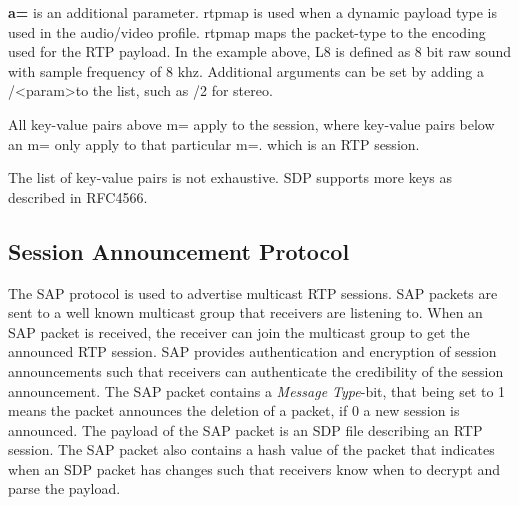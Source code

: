 \textbf{a=} is an additional parameter. rtpmap is used when a dynamic payload type is used in the audio/video profile. rtpmap maps the packet-type to the encoding used for the RTP payload. In the example above, L8 is defined as 8 bit raw sound with sample frequency of 8 khz. Additional arguments can be set by adding a /\textless param\textgreater to the list, such as /2 for stereo.

All key-value pairs above m= apply to the session, where key-value pairs below an m= only apply to that particular m=. which is an RTP session.

The list of key-value pairs is not exhaustive. SDP supports more keys as described in RFC4566.


\subsection{Session Announcement Protocol} \label{sec:design:sap}
The \ac{SAP} protocol is used to advertise multicast RTP sessions. SAP packets are sent to a well known multicast group that receivers are listening to. When an SAP packet is received, the receiver can join the multicast group to get the announced RTP session. SAP provides authentication and encryption of session announcements such that receivers can authenticate the credibility of the session announcement. The SAP packet contains a \textit{Message Type}-bit, that being set to 1 means the packet announces the deletion of a packet, if 0 a new session is announced. The payload of the SAP packet is an SDP file describing an RTP session. The SAP packet also contains a hash value of the packet that indicates when an SDP packet has changes such that receivers know when to decrypt and parse the payload. \citep{RFC2974}


